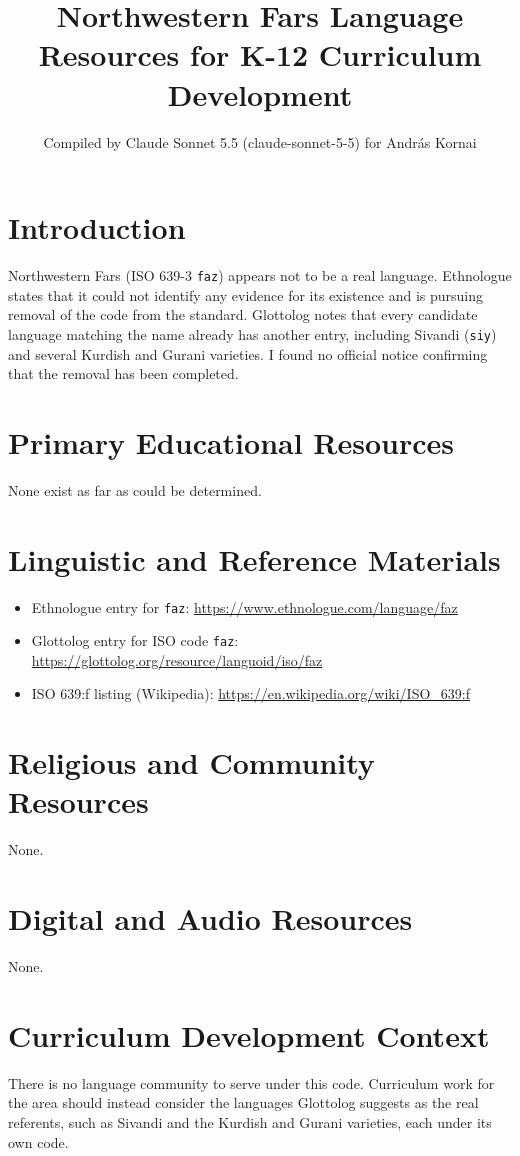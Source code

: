 \documentclass[12pt]{article}
\title{Northwestern Fars Language Resources for K-12 Curriculum Development}
\author{Compiled by Claude Sonnet 5.5 (claude-sonnet-5-5) for Andr\'as Kornai}
\date{}
\begin{document}
\maketitle

\section{Introduction}
Northwestern Fars (ISO 639-3 \texttt{faz}) appears not to be a real language. Ethnologue states that it could not identify any evidence for its existence and is pursuing removal of the code from the standard. Glottolog notes that every candidate language matching the name already has another entry, including Sivandi (\texttt{siy}) and several Kurdish and Gurani varieties. I found no official notice confirming that the removal has been completed.

\section{Primary Educational Resources}
None exist as far as could be determined.

\section{Linguistic and Reference Materials}
\begin{itemize}
\item Ethnologue entry for \texttt{faz}: \url{https://www.ethnologue.com/language/faz}
\item Glottolog entry for ISO code \texttt{faz}: \url{https://glottolog.org/resource/languoid/iso/faz}
\item ISO 639:f listing (Wikipedia): \url{https://en.wikipedia.org/wiki/ISO_639:f}
\end{itemize}

\section{Religious and Community Resources}
None.

\section{Digital and Audio Resources}
None.

\section{Curriculum Development Context}
There is no language community to serve under this code. Curriculum work for the area should instead consider the languages Glottolog suggests as the real referents, such as Sivandi and the Kurdish and Gurani varieties, each under its own code.
\end{document}
